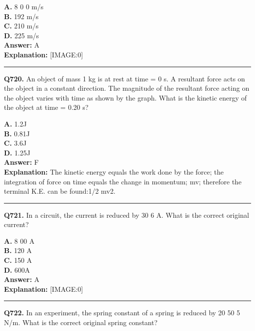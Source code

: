 \documentclass[12pt]{article}
\begin{document}
\textbf{A.} 8
0
0 m/s \\
\textbf{B.} 192 m/s \\
\textbf{C.} 210 m/s \\
\textbf{D.} 225 m/s \\

\textbf{Answer:} A \\
\textbf{Explanation:} [IMAGE:0]

\hrule
\vspace{1em}


\noindent
\textbf{Q720.} An object of mass 1 kg is at rest at time = 0 s. A resultant force acts on the object in a constant direction.
The magnitude of the resultant force acting on the object varies with time as shown by
the graph.
What is the kinetic energy of the object at time = 0.20 s?



\textbf{A.} 1.2J \\
\textbf{B.} 0.81J \\
\textbf{C.} 3.6J \\
\textbf{D.} 1.25J \\

\textbf{Answer:} F \\
\textbf{Explanation:} The kinetic energy equals the work done by the force; the integration of force on time equals the change in momentum; mv; therefore the terminal K.E. can be found:1/2 mv2.

\hrule
\vspace{1em}


\noindent
\textbf{Q721.} In a circuit, the current is reduced by 30%
6
A. What is the correct original current?



\textbf{A.} 8
00 A \\
\textbf{B.} 120 A \\
\textbf{C.} 150 A \\
\textbf{D.} 600A \\

\textbf{Answer:} A \\
\textbf{Explanation:} [IMAGE:0]

\hrule
\vspace{1em}


\noindent
\textbf{Q722.} In an experiment, the spring constant of a spring is reduced by 20%
50
5
N/m. What is the correct original spring constant?
\end{document}
